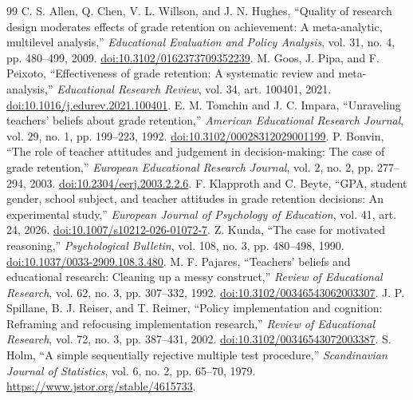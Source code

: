 \begin{thebibliography}{99}\small
{} C. S. Allen, Q. Chen, V. L. Willson, and J. N. Hughes, ``Quality of research design moderates effects of grade retention on achievement: A meta-analytic, multilevel analysis,'' \textit{Educational Evaluation and Policy Analysis}, vol. 31, no. 4, pp. 480--499, 2009. \href{https://doi.org/10.3102/0162373709352239}{doi:10.3102/0162373709352239}.
 M. Goos, J. Pipa, and F. Peixoto, ``Effectiveness of grade retention: A systematic review and meta-analysis,'' \textit{Educational Research Review}, vol. 34, art. 100401, 2021. \href{https://doi.org/10.1016/j.edurev.2021.100401}{doi:10.1016/j.edurev.2021.100401}.
 E. M. Tomchin and J. C. Impara, ``Unraveling teachers' beliefs about grade retention,'' \textit{American Educational Research Journal}, vol. 29, no. 1, pp. 199--223, 1992. \href{https://doi.org/10.3102/00028312029001199}{doi:10.3102/00028312029001199}.
 P. Bonvin, ``The role of teacher attitudes and judgement in decision-making: The case of grade retention,'' \textit{European Educational Research Journal}, vol. 2, no. 2, pp. 277--294, 2003. \href{https://doi.org/10.2304/eerj.2003.2.2.6}{doi:10.2304/eerj.2003.2.2.6}.
 F. Klapproth and C. Beyte, ``GPA, student gender, school subject, and teacher attitudes in grade retention decisions: An experimental study,'' \textit{European Journal of Psychology of Education}, vol. 41, art. 24, 2026. \href{https://doi.org/10.1007/s10212-026-01072-7}{doi:10.1007/s10212-026-01072-7}.
 Z. Kunda, ``The case for motivated reasoning,'' \textit{Psychological Bulletin}, vol. 108, no. 3, pp. 480--498, 1990. \href{https://doi.org/10.1037/0033-2909.108.3.480}{doi:10.1037/0033-2909.108.3.480}.
 M. F. Pajares, ``Teachers' beliefs and educational research: Cleaning up a messy construct,'' \textit{Review of Educational Research}, vol. 62, no. 3, pp. 307--332, 1992. \href{https://doi.org/10.3102/00346543062003307}{doi:10.3102/00346543062003307}.
 J. P. Spillane, B. J. Reiser, and T. Reimer, ``Policy implementation and cognition: Reframing and refocusing implementation research,'' \textit{Review of Educational Research}, vol. 72, no. 3, pp. 387--431, 2002. \href{https://doi.org/10.3102/00346543072003387}{doi:10.3102/00346543072003387}.
 S. Holm, ``A simple sequentially rejective multiple test procedure,'' \textit{Scandinavian Journal of Statistics}, vol. 6, no. 2, pp. 65--70, 1979. \url{https://www.jstor.org/stable/4615733}.

\end{thebibliography}
